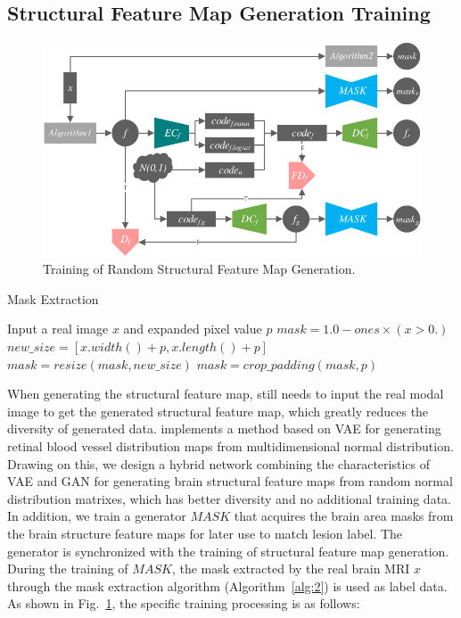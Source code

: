 \documentclass[letterpaper]{article} %
\begin{document}
\subsection{Structural Feature Map Generation Training}
\begin{figure}
	\centering
	\includegraphics[width=0.95\columnwidth]{figures/feature_train}
	\caption{Training of Random Structural Feature Map Generation.}
	\label{feature_train}
\end{figure}
\begin{algorithm}
	\caption{Mask Extraction}
	\label{alg:2}
	\begin{algorithmic}[1]
		\State Input a real image $x$ and expanded pixel value $p$
		\State $mask = 1.0 - ones \times (x > 0.)$
		\State $new\_size=[x.width() + p, x.length() + p]$
		\State $mask = resize(mask, new\_size)$
		\State $mask = crop\_padding(mask,p)$
	\end{algorithmic}  
\end{algorithm}
When generating the structural feature map, \cite{4shin2018medical} still needs to input the real modal image to get the generated structural feature map, which greatly reduces the diversity of generated data. \cite{41costa2017towards} implements a method based on VAE for generating retinal blood vessel distribution maps from multidimensional normal distribution. Drawing on this, we design a hybrid network combining the characteristics of VAE and GAN for generating brain structural feature maps from random normal distribution matrixes, which has better diversity and no additional training data. In addition,  we train a generator $MASK$ that acquires the brain area masks from the brain structure feature maps for later use to match lesion label. The generator is synchronized with the training of structural feature map generation. During the training of $MASK$, the mask extracted by the real brain MRI $x$ through the mask extraction algorithm (Algorithm~\ref{alg:2}) is used as label data. As shown in Fig.~\ref{feature_train}, the specific training processing is as follows:
\end{document}
